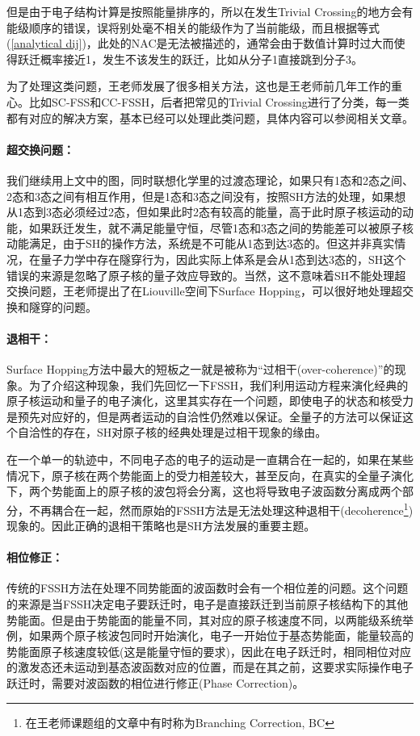 \documentclass[12pt,a4paper,openany,twoside]{book}
\numberwithin{equation}{section}
\begin{document}
        但是由于电子结构计算是按照能量排序的，所以在发生Trivial Crossing的地方会有能级顺序的错误，误将别处毫不相关的能级作为了当前能级，而且根据等式(\ref{analytical dij})，此处的NAC是无法被描述的，通常会由于数值计算时过大而使得跃迁概率接近1，发生不该发生的跃迁，比如从分子1直接跳到分子3。

        为了处理这类问题，王老师发展了很多相关方法，这也是王老师前几年工作的重心。比如SC-FSS和CC-FSSH，后者把常见的Trivial Crossing进行了分类，每一类都有对应的解决方案，基本已经可以处理此类问题，具体内容可以参阅相关文章\cite{wang2014simple}\cite{Qiu2018}\cite{Bai2018}。

        \paragraph{超交换问题：}我们继续用上文中的图，同时联想化学里的过渡态理论，如果只有1态和2态之间、2态和3态之间有相互作用，但是1态和3态之间没有，按照SH方法的处理，如果想从1态到3态必须经过2态，但如果此时2态有较高的能量，高于此时原子核运动的动能，如果跃迁发生，就不满足能量守恒，尽管1态和3态之间的势能差可以被原子核动能满足，由于SH的操作方法，系统是不可能从1态到达3态的。但这并非真实情况，在量子力学中存在隧穿行为，因此实际上体系是会从1态到达3态的，SH这个错误的来源是忽略了原子核的量子效应导致的。当然，这不意味着SH不能处理超交换问题，王老师提出了在Liouville空间下Surface Hopping\cite{wang2015fewest}，可以很好地处理超交换和隧穿的问题。

        \paragraph{退相干：}Surface Hopping方法中最大的短板之一就是被称为“过相干(over-coherence)”的现象。为了介绍这种现象，我们先回忆一下FSSH，我们利用运动方程来演化经典的原子核运动和量子的电子演化，这里其实存在一个问题，即使电子的状态和核受力是预先对应好的，但是两者运动的自洽性仍然难以保证。全量子的方法可以保证这个自洽性的存在，SH对原子核的经典处理是过相干现象的缘由。

        在一个单一的轨迹中，不同电子态的电子的运动是一直耦合在一起的，如果在某些情况下，原子核在两个势能面上的受力相差较大，甚至反向，在真实的全量子演化下，两个势能面上的原子核的波包将会分离，这也将导致电子波函数分离成两个部分，不再耦合在一起，然而原始的FSSH方法是无法处理这种退相干(decoherence\footnote{在王老师课题组的文章中有时称为Branching Correction, BC})现象的。因此正确的退相干策略也是SH方法发展的重要主题。
        
        \paragraph{相位修正：}传统的FSSH方法在处理不同势能面的波函数时会有一个相位差的问题。这个问题的来源是当FSSH决定电子要跃迁时，电子是直接跃迁到当前原子核结构下的其他势能面。但是由于势能面的能量不同，其对应的原子核速度不同，以两能级系统举例，如果两个原子核波包同时开始演化，电子一开始位于基态势能面，能量较高的势能面原子核速度较低(这是能量守恒的要求)，因此在电子跃迁时，相同相位对应的激发态还未运动到基态波函数对应的位置，而是在其之前，这要求实际操作电子跃迁时，需要对波函数的相位进行修正(Phase Correction)。
\end{document}
